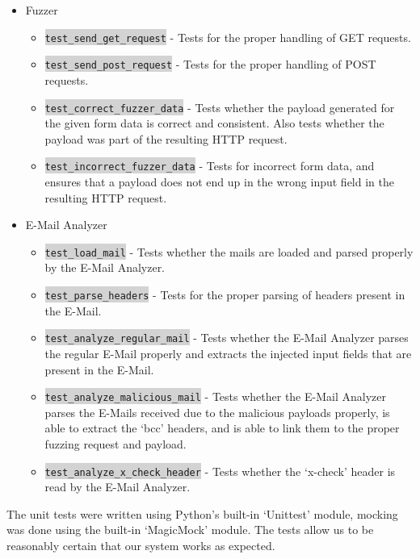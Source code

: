 \begin{itemize}
	\item Fuzzer
	\begin{itemize}
		\item \colorbox{lightgray}{\lstinline{test_send_get_request}} - Tests for the proper handling of GET requests.
		\item \colorbox{lightgray}{\lstinline{test_send_post_request}} - Tests for the proper handling of POST requests.
		\item \colorbox{lightgray}{\lstinline{test_correct_fuzzer_data}} - Tests whether the payload generated for the given form data is correct and consistent. Also tests whether the payload was part of the resulting HTTP request.
		\item \colorbox{lightgray}{\lstinline{test_incorrect_fuzzer_data}} - Tests for incorrect form data, and ensures that a payload does not end up in the wrong input field in the resulting HTTP request.
	\end{itemize}
	\item E-Mail Analyzer
	\begin{itemize}
		\item \colorbox{lightgray}{\lstinline{test_load_mail}} - Tests whether the mails are loaded and parsed properly by the E-Mail Analyzer.
		\item \colorbox{lightgray}{\lstinline{test_parse_headers}} - Tests for the proper parsing of headers present in the E-Mail.
		\item \colorbox{lightgray}{\lstinline{test_analyze_regular_mail}} - Tests whether the E-Mail Analyzer parses the regular E-Mail properly and extracts the injected input fields that are present in the E-Mail.
		\item \colorbox{lightgray}{\lstinline{test_analyze_malicious_mail}} - Tests whether the E-Mail Analyzer parses the E-Mails received due to the malicious payloads properly, is able to extract the `bcc' headers, and is able to link them to the proper fuzzing request and payload.
		\item \colorbox{lightgray}{\lstinline{test_analyze_x_check_header}} - Tests whether the `x-check' header is read by the E-Mail Analyzer.
	\end{itemize}
\end{itemize}
The unit tests were written using Python's built-in `Unittest' module, mocking was done using the built-in `MagicMock' module. The tests allow us to be reasonably certain that our system works as expected.

